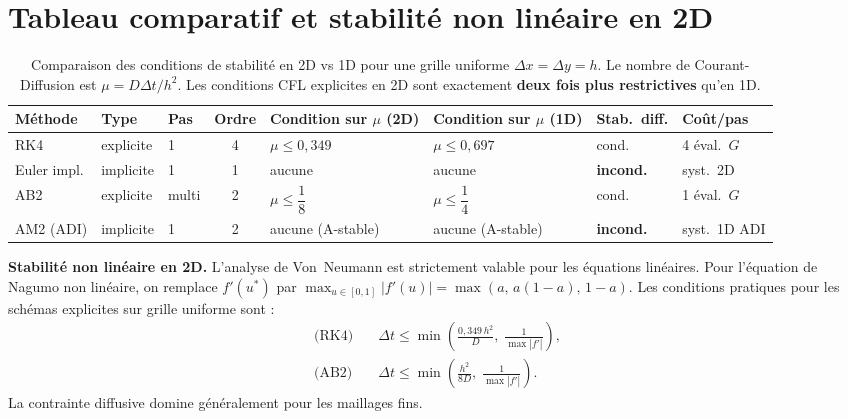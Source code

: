 \documentclass[11pt,a4paper]{report}
\begin{document}
\section{Tableau comparatif et stabilit\'e non lin\'eaire en 2D}

\begin{table}[H]
\centering
\begin{tabular}{@{}lllcllll@{}}
\toprule
\textbf{M\'ethode} & \textbf{Type} & \textbf{Pas} & \textbf{Ordre} &
\textbf{Condition sur $\mu$ (2D)} & \textbf{Condition sur $\mu$ (1D)} &
\textbf{Stab.\ diff.} & \textbf{Co\^ut/pas} \\
\midrule
RK4           & explicite & 1     & 4 & $\mu\le 0{,}349$              & $\mu\le 0{,}697$ & cond.\ & 4 \'eval.\ $G$ \\[4pt]
Euler impl.   & implicite & 1     & 1 & aucune                        & aucune           & \textbf{incond.}  & syst.\ 2D      \\[4pt]
AB2           & explicite & multi & 2 & $\mu\le\dfrac{1}{8}$          & $\mu\le\dfrac{1}{4}$ & cond.\ & 1 \'eval.\ $G$ \\[4pt]
AM2 (ADI)     & implicite & 1     & 2 & aucune (A-stable)             & aucune (A-stable)& \textbf{incond.}  & syst.\ 1D ADI  \\
\bottomrule
\end{tabular}
\caption{Comparaison des conditions de stabilit\'e en 2D vs 1D pour une grille uniforme
$\Delta x=\Delta y=h$. Le nombre de Courant-Diffusion est $\mu=D\Delta t/h^2$.
Les conditions CFL explicites en 2D sont exactement \textbf{deux fois plus restrictives}
qu'en 1D.}
\end{table}

\medskip
\noindent\textbf{Stabilit\'e non lin\'eaire en 2D.}
L'analyse de Von~Neumann est strictement valable pour les \'equations lin\'eaires.
Pour l'\'equation de Nagumo non lin\'eaire, on remplace $f'(u^*)$ par
$\max_{u\in[0,1]}|f'(u)|=\max(a,\,a(1-a),\,1-a)$.
Les conditions pratiques pour les sch\'emas explicites sur grille uniforme sont :
\begin{align}
  \text{(RK4)}\quad
  & \Delta t \le \min\!\left(\frac{0{,}349\,h^2}{D},\;\frac{1}{\max|f'|}\right), \\[4pt]
  \text{(AB2)}\quad
  & \Delta t \le \min\!\left(\frac{h^2}{8D},\;\frac{1}{\max|f'|}\right).
\end{align}
La contrainte diffusive domine g\'en\'eralement pour les maillages fins.
\end{document}
